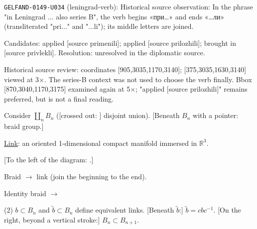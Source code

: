 \noindent\texttt{GELFAND-0149-U034} (leningrad-verb): Historical source observation: In the phrase "in Leningrad ... also series B", the verb begins «при…» and ends «…ли» (transliterated "pri..." and "...li"); its middle letters are joined.\par
Candidates: applied [source primenili]; applied [source prilozhili]; brought in [source privlekli]. Resolution: unresolved in the diplomatic source.\par
Historical source review: coordinates [905,3035,1170,3140]; [375,3035,1630,3140] viewed at 3×. The series-B context was not used to choose the verb finally. Bbox [870,3040,1170,3175] examined again at 5×; "applied [source prilozhili]" remains preferred, but is not a final reading.\par



Consider $\coprod_n B_n$
([crossed out: ]
disjoint union).
[Beneath $B_n$ with a pointer: braid group.]

\underline{Link}: an oriented 1-dimensional compact manifold immersed in $\mathbb R^3$.

[To the left of the diagram: .]


Braid $\longrightarrow$ link (join the beginning to the end).

Identity braid $\longrightarrow$

(2) $b\subset B_n$ and $\widetilde b\subset B_n$ define equivalent links.
[Beneath $\widetilde b$:] $\widetilde b=cbc^{-1}$.
[On the right, beyond a vertical stroke:] $B_n\subset B_{n+1}$.

